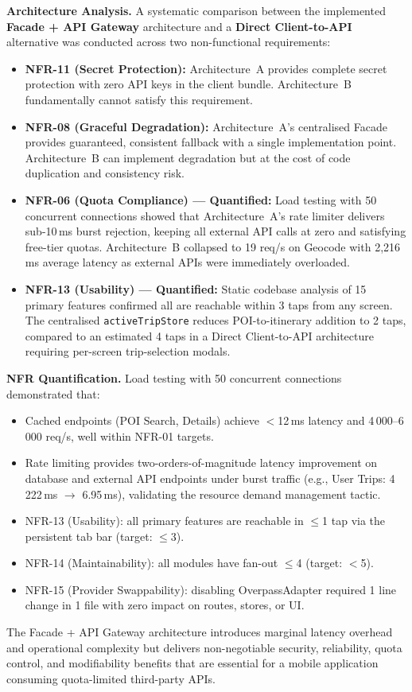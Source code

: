 \documentclass[12pt, a4paper]{article}
\newcommand{\reqid}[1]{\textsc{\small #1}}
\begin{document}
\textbf{Architecture Analysis.} A systematic comparison between the implemented \textbf{Facade + API Gateway} architecture and a \textbf{Direct Client-to-API} alternative was conducted across two non-functional requirements:

\begin{itemize}
  \item \textbf{NFR-11 (Secret Protection):} Architecture~A provides complete secret protection with zero API keys in the client bundle. Architecture~B fundamentally cannot satisfy this requirement.
  \item \textbf{NFR-08 (Graceful Degradation):} Architecture~A's centralised Facade provides guaranteed, consistent fallback with a single implementation point. Architecture~B can implement degradation but at the cost of code duplication and consistency risk.
  \item \textbf{NFR-06 (Quota Compliance) --- Quantified:} Load testing with 50 concurrent connections showed that Architecture~A's rate limiter delivers sub-10\,ms burst rejection, keeping all external API calls at zero and satisfying free-tier quotas. Architecture~B collapsed to 19 req/s on Geocode with 2,216\,ms average latency as external APIs were immediately overloaded.
  \item \textbf{NFR-13 (Usability) --- Quantified:} Static codebase analysis of 15 primary features confirmed all are reachable within 3 taps from any screen. The centralised \texttt{activeTripStore} reduces POI-to-itinerary addition to 2 taps, compared to an estimated 4 taps in a Direct Client-to-API architecture requiring per-screen trip-selection modals.
\end{itemize}

\textbf{NFR Quantification.} Load testing with 50 concurrent connections demonstrated that:
\begin{itemize}
  \item Cached endpoints (POI Search, Details) achieve $<$12\,ms latency and 4\,000--6\,000 req/s, well within \reqid{NFR-01} targets.
  \item Rate limiting provides two-orders-of-magnitude latency improvement on database and external API endpoints under burst traffic (e.g., User Trips: 4\,222\,ms $\to$ 6.95\,ms), validating the resource demand management tactic.
  \item \reqid{NFR-13} (Usability): all primary features are reachable in $\leq$1 tap via the persistent tab bar (target: $\leq$3).
  \item \reqid{NFR-14} (Maintainability): all modules have fan-out $\leq$4 (target: $<$5).
  \item \reqid{NFR-15} (Provider Swappability): disabling OverpassAdapter required 1 line change in 1 file with zero impact on routes, stores, or UI.
\end{itemize}

The Facade + API Gateway architecture introduces marginal latency overhead and operational complexity but delivers non-negotiable security, reliability, quota control, and modifiability benefits that are essential for a mobile application consuming quota-limited third-party APIs.
\end{document}
